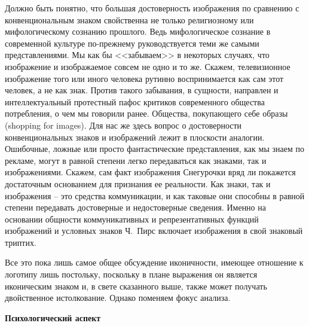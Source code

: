 Должно быть понятно, что большая достоверность изображения по сравнению с
конвенциональным знаком свойственна не только религиозному или
мифологическому сознанию прошлого. Ведь мифологическое сознание в современной
культуре по-прежнему руководствуется теми же самыми представлениями.
Мы как бы <<забываем>> в некоторых случаях, что изображение и изображаемое
совсем не одно и то же. Скажем,
телевизионное изображение того или иного человека рутинно воспринимается
как сам этот человек, а не как знак. Против такого забывания, в
сущности, направлен и интеллектуальный протестный пафос критиков современного
общества потребления, о чем мы говорили ранее. Общества, покупающего себе образы
(shopping for images).\autocite{ginsberg1984supermarket} Для нас же здесь вопрос о
достоверности конвенциональных знаков и изображений лежит в плоскости аналогии.
Ошибочные, ложные или просто фантастические представления, как мы знаем по
рекламе, могут в равной степени легко передаваться как знаками, так и
изображениями. Скажем, сам факт изображения Снегурочки вряд ли покажется
достаточным основанием для признания ее реальности. Как знаки, так и
изображения -- это средства коммуникации, и как таковые они способны в равной
степени передавать достоверные и недостоверные сведения. Именно на основании
общности коммуникативных и репрезентативных функций изображений и условных знаков
Ч.~Пирс включает изображения в  свой знаковый триптих.

Все это пока лишь самое общее обсуждение иконичности, имеющее отношение
к логотипу лишь постольку, поскольку в плане выражения он  является иконическим
знаком и, в свете сказанного выше, также может получать двойственное
истолкование. Однако поменяем  фокус анализа.

\textbf{Психологический аспект}

